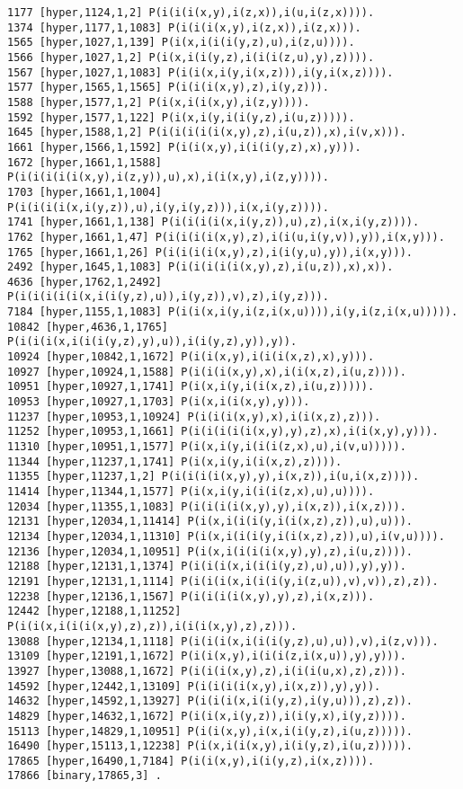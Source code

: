{\begin{verbatim}
1177 [hyper,1124,1,2] P(i(i(i(x,y),i(z,x)),i(u,i(z,x)))).
1374 [hyper,1177,1,1083] P(i(i(i(x,y),i(z,x)),i(z,x))).
1565 [hyper,1027,1,139] P(i(x,i(i(i(y,z),u),i(z,u)))).
1566 [hyper,1027,1,2] P(i(x,i(i(y,z),i(i(i(z,u),y),z)))).
1567 [hyper,1027,1,1083] P(i(i(x,i(y,i(x,z))),i(y,i(x,z)))).
1577 [hyper,1565,1,1565] P(i(i(i(x,y),z),i(y,z))).
1588 [hyper,1577,1,2] P(i(x,i(i(x,y),i(z,y)))).
1592 [hyper,1577,1,122] P(i(x,i(y,i(i(y,z),i(u,z))))).
1645 [hyper,1588,1,2] P(i(i(i(i(i(x,y),z),i(u,z)),x),i(v,x))).
1661 [hyper,1566,1,1592] P(i(i(x,y),i(i(i(y,z),x),y))).
1672 [hyper,1661,1,1588] P(i(i(i(i(i(x,y),i(z,y)),u),x),i(i(x,y),i(z,y)))).
1703 [hyper,1661,1,1004] P(i(i(i(i(x,i(y,z)),u),i(y,i(y,z))),i(x,i(y,z)))).
1741 [hyper,1661,1,138] P(i(i(i(i(x,i(y,z)),u),z),i(x,i(y,z)))).
1762 [hyper,1661,1,47] P(i(i(i(i(x,y),z),i(i(u,i(y,v)),y)),i(x,y))).
1765 [hyper,1661,1,26] P(i(i(i(i(x,y),z),i(i(y,u),y)),i(x,y))).
2492 [hyper,1645,1,1083] P(i(i(i(i(i(x,y),z),i(u,z)),x),x)).
4636 [hyper,1762,1,2492] P(i(i(i(i(i(x,i(i(y,z),u)),i(y,z)),v),z),i(y,z))).
7184 [hyper,1155,1,1083] P(i(i(x,i(y,i(z,i(x,u)))),i(y,i(z,i(x,u))))).
10842 [hyper,4636,1,1765] P(i(i(i(x,i(i(i(y,z),y),u)),i(i(y,z),y)),y)).
10924 [hyper,10842,1,1672] P(i(i(x,y),i(i(i(x,z),x),y))).
10927 [hyper,10924,1,1588] P(i(i(i(x,y),x),i(i(x,z),i(u,z)))).
10951 [hyper,10927,1,1741] P(i(x,i(y,i(i(x,z),i(u,z))))).
10953 [hyper,10927,1,1703] P(i(x,i(i(x,y),y))).
11237 [hyper,10953,1,10924] P(i(i(i(x,y),x),i(i(x,z),z))).
11252 [hyper,10953,1,1661] P(i(i(i(i(i(x,y),y),z),x),i(i(x,y),y))).
11310 [hyper,10951,1,1577] P(i(x,i(y,i(i(i(z,x),u),i(v,u))))).
11344 [hyper,11237,1,1741] P(i(x,i(y,i(i(x,z),z)))).
11355 [hyper,11237,1,2] P(i(i(i(i(x,y),y),i(x,z)),i(u,i(x,z)))).
11414 [hyper,11344,1,1577] P(i(x,i(y,i(i(i(z,x),u),u)))).
12034 [hyper,11355,1,1083] P(i(i(i(i(x,y),y),i(x,z)),i(x,z))).
12131 [hyper,12034,1,11414] P(i(x,i(i(i(y,i(i(x,z),z)),u),u))).
12134 [hyper,12034,1,11310] P(i(x,i(i(i(y,i(i(x,z),z)),u),i(v,u)))).
12136 [hyper,12034,1,10951] P(i(x,i(i(i(i(x,y),y),z),i(u,z)))).
12188 [hyper,12131,1,1374] P(i(i(i(x,i(i(i(y,z),u),u)),y),y)).
12191 [hyper,12131,1,1114] P(i(i(i(x,i(i(i(y,i(z,u)),v),v)),z),z)).
12238 [hyper,12136,1,1567] P(i(i(i(i(x,y),y),z),i(x,z))).
12442 [hyper,12188,1,11252] P(i(i(x,i(i(i(x,y),z),z)),i(i(i(x,y),z),z))).
13088 [hyper,12134,1,1118] P(i(i(i(x,i(i(i(y,z),u),u)),v),i(z,v))).
13109 [hyper,12191,1,1672] P(i(i(x,y),i(i(i(z,i(x,u)),y),y))).
13927 [hyper,13088,1,1672] P(i(i(i(x,y),z),i(i(i(u,x),z),z))).
14592 [hyper,12442,1,13109] P(i(i(i(i(x,y),i(x,z)),y),y)).
14632 [hyper,14592,1,13927] P(i(i(i(x,i(i(y,z),i(y,u))),z),z)).
14829 [hyper,14632,1,1672] P(i(i(x,i(y,z)),i(i(y,x),i(y,z)))).
15113 [hyper,14829,1,10951] P(i(i(x,y),i(x,i(i(y,z),i(u,z))))).
16490 [hyper,15113,1,12238] P(i(x,i(i(x,y),i(i(y,z),i(u,z))))).
17865 [hyper,16490,1,7184] P(i(i(x,y),i(i(y,z),i(x,z)))).
17866 [binary,17865,3] .


\end{verbatim}}
